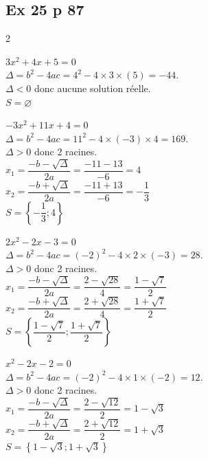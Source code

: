 \documentclass[12pt,a4paper]{book}
\begin{document}
\subsection*{Ex 25 p 87}
\begin{multicols}{2}
\begin{enumMet}
    \item $3x^2+4x+5=0$\\
    $\Delta=b^2-4ac=4^2-4\times3\times(5)=-44$.\\
    $\Delta<0$ donc aucune solution réelle.\\
    $S=\varnothing$
    \item $-3x^2+11x+4=0$\\
    $\Delta=b^2-4ac=11^2-4\times(-3)\times4=169$.\\
    $\Delta>0$ donc 2 racines.\\
    $x_1=\dfrac{-b-\sqrt{\Delta}}{2a}=\dfrac{-11-13}{-6}=4$\\
    $x_2=\dfrac{-b+\sqrt{\Delta}}{2a}=\dfrac{-11+13}{-6}=-\dfrac{1}{3}$\\
    $S=\left\{-\dfrac{1}{3};4\right\}$
    
    \columnbreak
    \item $2x^2-2x-3=0$\\
    $\Delta=b^2-4ac=(-2)^2-4\times2\times(-3)=28$.\\
    $\Delta>0$ donc 2 racines.\\
    $x_1=\dfrac{-b-\sqrt{\Delta}}{2a}=\dfrac{2-\sqrt{28}}{4}=\dfrac{1-\sqrt{7}}{2}$\\
    $x_2=\dfrac{-b+\sqrt{\Delta}}{2a}=\dfrac{2+\sqrt{28}}{4}=\dfrac{1+\sqrt{7}}{2}$\\
    $S=\left\{\dfrac{1-\sqrt{7}}{2};\dfrac{1+\sqrt{7}}{2}\right\}$
    \item $x^2-2x-2=0$\\
    $\Delta=b^2-4ac=(-2)^2-4\times1\times(-2)=12$.\\
    $\Delta>0$ donc 2 racines.\\
    $x_1=\dfrac{-b-\sqrt{\Delta}}{2a}=\dfrac{2-\sqrt{12}}{2}=1-\sqrt{3}$\\
    $x_2=\dfrac{-b+\sqrt{\Delta}}{2a}=\dfrac{2+\sqrt{12}}{2}=1+\sqrt{3}$\\
    $S=\left\{1-\sqrt{3};1+\sqrt{3}\right\}$
\end{enumMet}
\end{multicols}
\end{document}
